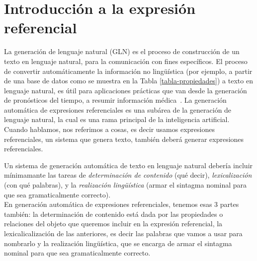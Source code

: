 \chapter{Introducci\'on a la expresi\'on referencial}
\label{sec:intro}



La generaci\'on de lenguaje natural (GLN) es el proceso de construcci\'on de un texto en lenguaje natural, para la comunicaci\'on con fines espec\'ificos. El proceso de convertir autom\'aticamente la informaci\'on no ling\"u\'{i}stica (por ejemplo, a partir de una base de datos como se muestra en la Tabla \ref{tabla-propiedades}) a texto en lenguaje natural, es \'util para aplicaciones pr\'acticas que van desde la generaci\'on de pron\'osticos del tiempo, a resumir informaci\'on m\'edica~\cite{dale2000}. La generaci\'on autom\'atica de expresiones referenciales es una sub\'area de la generaci\'on de lenguaje natural, la cual es una rama principal de la inteligencia artificial. Cuando hablamos, nos referimos a cosas, es decir usamos expresiones referenciales, un sistema que genera texto, tambi\'en deber\'a generar expresiones referenciales.


Un sistema de generaci\'on autom\'atica de texto en lenguaje natural deber\'ia incluir m\'inimamante 
las tareas de \emph{determinaci\'on de contenido} (qu\'e decir), \emph{lexicalizaci\'on} (con qu\'e palabras), y la \emph{realizaci\'on ling\"{u}\'istica} (armar el  sintagma nominal para que sea gramaticalmente correcto). \\
En generaci\'on autom\'atica de expresiones referenciales, tenemos esas 3 partes tambi\'en: la determinaci\'on de contenido est\'a dada por las propiedades o relaciones del objeto que queremos incluir en la expresi\'on referencial, la lexicalicalizaci\'on de las anteriores, es decir las palabras que vamos a usar para nombrarlo y la realizaci\'on ling\"u\'istica, que se encarga de armar el sintagma nominal para que sea gramaticalmente correcto.\\

